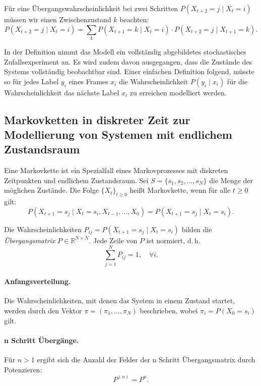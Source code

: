 Für eine Übergangswahrscheinlichkeit bei zwei Schritten $P(X_{t+2} = j \mid X_t = i)$ müssen wir einen Zwischenzustand $k$ beachten:
\begin{equation}
P(X_{t+2} = j \mid X_t = i) = \sum_k P(X_{t+1} = k \mid X_t = i) \cdot P(X_{t+2} = j \mid X_{t+1} = k).
\end{equation}

In der Definition nimmt das Modell ein vollständig abgebildetes stochastisches Zufallsexperiment an. Es wird zudem davon ausgegangen, dass die Zustände des Systems vollständig beobachtbar sind. Einer einfachen Definition folgend, müsste so für jedes Label $y_i$ eines Frames $x_i$ die Wahrscheinlichkeit $P(y_i \mid x_i)$ für die Wahrscheinlichkeit das nächste Label $x_i$ zu erreichen modelliert werden. \cite{drake88}

\subsection{Markovketten in diskreter Zeit zur Modellierung von Systemen mit endlichem Zustandsraum}

Eine Markovkette ist ein Spezialfall eines Markovprozesses mit diskreten Zeitpunkten und endlichem Zustandsraum. 
Sei $S = \{s_1, s_2, \dots, s_N\}$ die Menge der möglichen Zustände.
Die Folge $\{X_t\}_{t \ge 0}$ heißt Markovkette, wenn für alle $t \ge 0$ gilt:
\begin{equation}
P(X_{t+1} = s_j \mid X_t = s_i, X_{t-1}, \dots, X_0)
= P(X_{t+1} = s_j \mid X_t = s_i).
\end{equation}

Die Wahrscheinlichkeiten $P_{ij} = P(X_{t+1} = s_j \mid X_t = s_i)$ bilden die
\emph{Übergangsmatrix} $P \in \mathbb{R}^{N \times N}$.
Jede Zeile von $P$ ist normiert, d.\,h.
\begin{equation}
\sum_{j=1}^{N} P_{ij} = 1, \quad \forall i.
\end{equation}

\paragraph{Anfangsverteilung.}
Die Wahrscheinlichkeiten, mit denen das System in einem Zustand startet, werden durch den Vektor $\pi = (\pi_1, \ldots, \pi_N)$ beschrieben, wobei $\pi_i = P(X_0 = s_i)$ gilt.

\paragraph{n Schritt Übergänge.}
Für $n > 1$ ergibt sich die Anzahl der Felder der n Schritt Übergangsmatrix durch Potenzieren:
\begin{equation}
P^{(n)} = P^n.
\end{equation}

